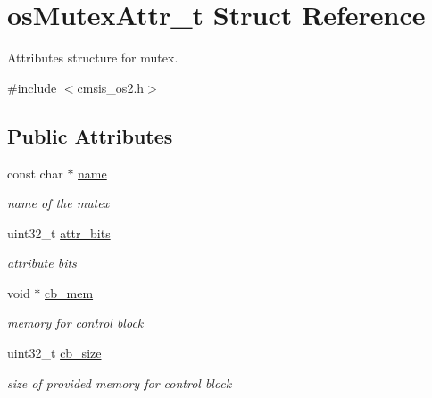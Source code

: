 \hypertarget{structos_mutex_attr__t}{}\section{os\+Mutex\+Attr\+\_\+t Struct Reference}
\label{structos_mutex_attr__t}


Attributes structure for mutex.  




{\ttfamily \#include $<$cmsis\+\_\+os2.\+h$>$}

\subsection*{Public Attributes}
\begin{DoxyCompactItemize}
\item 
\mbox{\label{structos_mutex_attr__t_af3997dba664ce0e0f788a35e8f473a4d}} 
const char $\ast$ \mbox{\hyperlink{structos_mutex_attr__t_af3997dba664ce0e0f788a35e8f473a4d}{name}}
\begin{DoxyCompactList}\small\item\em name of the mutex \end{DoxyCompactList}\item 
\mbox{\label{structos_mutex_attr__t_a9dbf080ff04a6e5fde40b8e962868fd5}} 
uint32\+\_\+t \mbox{\hyperlink{structos_mutex_attr__t_a9dbf080ff04a6e5fde40b8e962868fd5}{attr\+\_\+bits}}
\begin{DoxyCompactList}\small\item\em attribute bits \end{DoxyCompactList}\item 
\mbox{\label{structos_mutex_attr__t_afb6e0bd20375f3ebc1cca487b9c01799}} 
void $\ast$ \mbox{\hyperlink{structos_mutex_attr__t_afb6e0bd20375f3ebc1cca487b9c01799}{cb\+\_\+mem}}
\begin{DoxyCompactList}\small\item\em memory for control block \end{DoxyCompactList}\item 
\mbox{\label{structos_mutex_attr__t_a444c834a2336196cc87b200cbd33106c}} 
uint32\+\_\+t \mbox{\hyperlink{structos_mutex_attr__t_a444c834a2336196cc87b200cbd33106c}{cb\+\_\+size}}
\begin{DoxyCompactList}\small\item\em size of provided memory for control block \end{DoxyCompactList}\end{DoxyCompactItemize}


